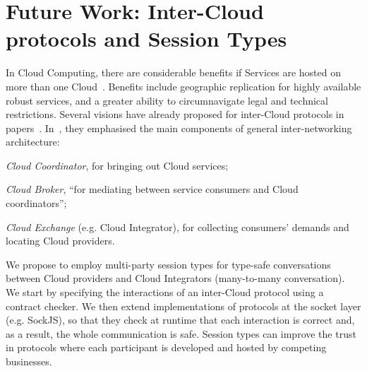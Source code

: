 \documentclass[10pt]{llncs}
\begin{document}


\section{Future Work: Inter-Cloud protocols and Session Types}
\label{sect:highlights}
In Cloud Computing, there are considerable benefits if Services are hosted on more than one Cloud~\cite{Armbrust2010,Buyya2009,intercloud}. Benefits include geographic replication for highly available robust services, and a greater ability to circumnavigate legal and technical restrictions. 
Several visions have already proposed for inter-Cloud protocols in papers~\cite{utility-driven-fed,xmpp-intercloud-transport,cloud-integrator}. In~\cite{utility-driven-fed}, they emphasised the main components of general inter-networking architecture:
\begin{inparaenum}
\item \textit{Cloud Coordinator}, for bringing out Cloud services;
\item \textit{Cloud Broker}, ``for mediating between service consumers and Cloud coordinators'';
\item \textit{Cloud Exchange} (e.g. Cloud Integrator), for collecting consumers' demands and locating Cloud providers. %
\end{inparaenum}

We propose to employ multi-party session types \cite{ng2012multiparty} for type-safe conversations between Cloud providers and Cloud Integrators (many-to-many conversation).
We start by specifying the interactions of an inter-Cloud protocol using a contract checker.
We then extend implementations of protocols at the socket layer (e.g. SockJS), so that they check at runtime that each interaction is correct and, as a result, the whole communication is safe.
Session types can improve the trust in protocols where each participant is developed and hosted by competing businesses.
\end{document}
